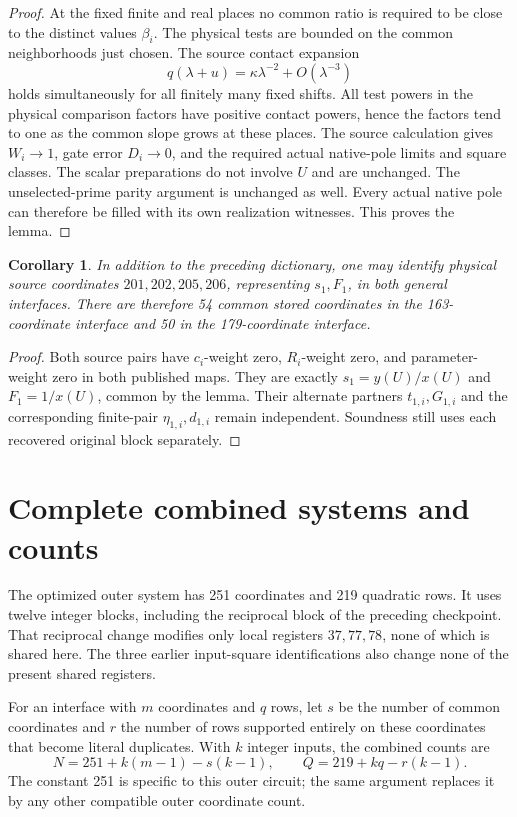 \documentclass[11pt]{article}
\newtheorem{corollary}[theorem]{Corollary}
\begin{document}
\begin{proof}
At the fixed finite and real places no common ratio is required to be
close to the distinct values \(\beta_i\).  The physical tests are
bounded on the common neighborhoods just chosen.  The source contact
expansion
\[
       q(\lambda+u)=\kappa\lambda^{-2}+O(\lambda^{-3})
\]
holds simultaneously for all finitely many fixed shifts.  All test
powers in the physical comparison factors have positive contact
powers, hence the factors tend to one as the common slope grows at
these places.  The source calculation gives \(W_i\to1\), gate error
\(D_i\to0\), and the required actual native-pole limits and square
classes.  The scalar preparations do not involve \(U\) and are
unchanged.  The unselected-prime parity argument is unchanged as well.
Every actual native pole can therefore be filled with its own
realization witnesses.  This proves the lemma.
\end{proof}

\begin{corollary}\label{cor:four-more}
In addition to the preceding dictionary, one may identify physical
source coordinates \(201,202,205,206\), representing \(s_1,F_1\), in
both general interfaces.  There are therefore 54 common stored
coordinates in the 163-coordinate interface and 50 in the
179-coordinate interface.
\end{corollary}
\begin{proof}
Both source pairs have \(c_i\)-weight zero, \(R_i\)-weight zero, and
parameter-weight zero in both published maps.  They are exactly
\(s_1=y(U)/x(U)\) and \(F_1=1/x(U)\), common by the lemma.
Their alternate partners \(t_{1,i},G_{1,i}\) and the corresponding
finite-pair \(\eta_{1,i},d_{1,i}\) remain independent.  Soundness still
uses each recovered original block separately.
\end{proof}

\section{Complete combined systems and counts}

The optimized outer system has 251 coordinates and 219 quadratic rows.
It uses twelve integer blocks, including the reciprocal block of the
preceding checkpoint.  That reciprocal change modifies only local
registers \(37,77,78\), none of which is shared here.  The three earlier
input-square identifications also change none of the present shared
registers.

For an interface with \(m\) coordinates and \(q\) rows, let \(s\) be
the number of common coordinates and \(r\) the number of rows supported
entirely on these coordinates that become literal duplicates.  With
\(k\) integer inputs, the combined counts are
\begin{equation}\label{eq:common-count}
 N=251+k(m-1)-s(k-1),\qquad
 Q=219+kq-r(k-1).
\end{equation}
The constant 251 is specific to this outer circuit; the same argument
replaces it by any other compatible outer coordinate count.
\end{document}
